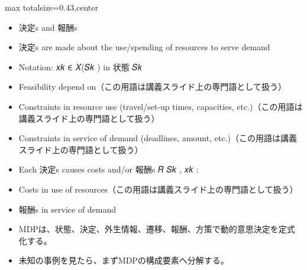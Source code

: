 \clearpage
{}
\begin{minipage}[t]{0.405\textwidth}
\begin{adjustbox}{max totalsize={\textwidth}{0.43\textheight},center}
\begin{minipage}{\textwidth}\scriptsize
{}\begin{itemize}
\item 決定s and 報酬s
\item 決定s are made about the use/spending of resources to serve demand
\item Notation: 𝑥𝑘 ∈ 𝑋(𝑆𝑘 ) in 状態 𝑆𝑘
\item Feasibility depend on（この用語は講義スライド上の専門語として扱う）
\item Constraints in resource use (travel/set-up times, capacities, etc.)（この用語は講義スライド上の専門語として扱う）
\item Constraints in service of demand (deadlines, amount, etc.)（この用語は講義スライド上の専門語として扱う）
\item Each 決定s causes costs and/or 報酬s 𝑅 𝑆𝑘 , 𝑥𝑘 :
\item Costs in use of resources（この用語は講義スライド上の専門語として扱う）
\item 報酬s in service of demand
\end{itemize}\begin{itemize}
\item MDPは、状態、決定、外生情報、遷移、報酬、方策で動的意思決定を定式化する。
\item 未知の事例を見たら、まずMDPの構成要素へ分解する。
\end{itemize}
\end{minipage}
\end{adjustbox}
\end{minipage}\hfill
